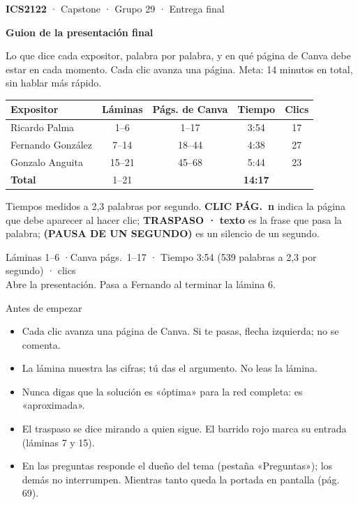 \documentclass[12pt]{article}
\makeatletter
\newcommand{\clic}[1]{\hspace{2pt}\colorbox{azulsuave}{\sffamily\scriptsize\bfseries\color{azul}CLIC \textrightarrow{} PÁG.~#1}}
\newcommand{\traspaso}[1]{{\color{rojo}\sffamily\scriptsize\bfseries TRASPASO · }{\color{rojo}\bfseries #1}}
\newcommand{\pausa}{{\color{rojo}\sffamily\scriptsize\bfseries (PAUSA DE UN SEGUNDO)}}
\newenvironment{resumen}{\par\sffamily\small\color{gris}}{\par\vspace{4pt}}
\renewcommand\section{\@startsection{section}{1}{0pt}{-6pt}{8pt}{\sffamily\bfseries\Huge}}
\makeatother
\begin{document}
{\sffamily\small\color{gris}\textbf{\color{rojo}ICS2122} · Capstone · Grupo 29 · Entrega final}

\vspace{4pt}
{\sffamily\bfseries\Huge Guion de la presentación final}

\vspace{8pt}
Lo que dice cada expositor, palabra por palabra, y en qué página de Canva debe estar en cada momento.
Cada clic avanza una página. Meta: 14 minutos en total, sin hablar más rápido.

\vspace{10pt}
\begin{tabular}{@{}l c c c c@{}}
\toprule
\textbf{Expositor} & \textbf{Láminas} & \textbf{Págs. de Canva} & \textbf{Tiempo} & \textbf{Clics} \\
\midrule
Ricardo Palma & 1--6 & 1--17 & 3:54 & 17 \\
Fernando González & 7--14 & 18--44 & 4:38 & 27 \\
Gonzalo Anguita & 15--21 & 45--68 & 5:44 & 23 \\
\midrule
\textbf{Total} & 1--21 & & \textbf{14:17} & \\
\bottomrule
\end{tabular}

\vspace{8pt}
{\small\color{gris}Tiempos medidos a 2,3 palabras por segundo. \clic{n} indica la página que debe aparecer
al hacer clic; \traspaso{texto} es la frase que pasa la palabra; \pausa{} es un silencio de un segundo.}


\clearpage
\section{Ricardo Palma}\label{ricardo}
\begin{resumen}
Láminas 1--6 \quad·\quad Canva págs.~1--17 \quad·\quad
Tiempo 3:54 (539 palabras a 2,3 por segundo) \quad· clics\\
Abre la presentación. Pasa a Fernando al terminar la lámina 6.
\end{resumen}
\begin{reglas}{Antes de empezar}
\begin{itemize}[leftmargin=*, itemsep=1pt]
  \item Cada clic avanza una página de Canva. Si te pasas, flecha izquierda; no se comenta.
  \item La lámina muestra las cifras; tú das el argumento. No leas la lámina.
  \item Nunca digas que la solución es «óptima» para la red completa: es «aproximada».
  \item El traspaso se dice mirando a quien sigue. El barrido rojo marca su entrada (láminas 7 y 15).
  \item En las preguntas responde el dueño del tema (pestaña «Preguntas»); los demás no interrumpen. Mientras tanto queda la portada en pantalla (pág. 69).
\end{itemize}
\end{reglas}
\end{document}
